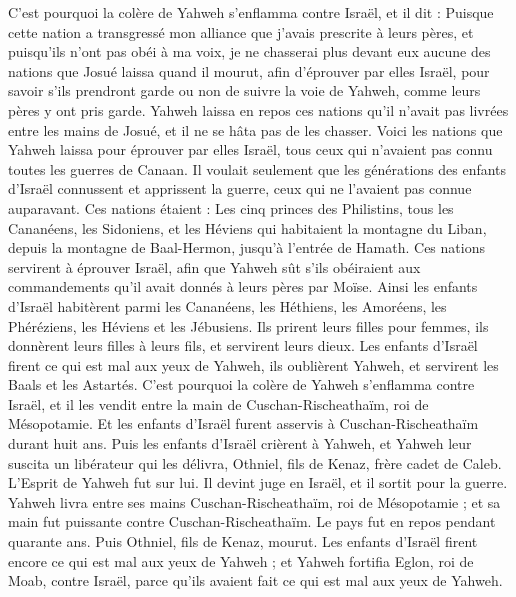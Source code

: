 \begin{multicols}{2}
C'est pourquoi la colère de Yahweh s'enflamma contre Israël, et il dit : Puisque cette nation a transgressé mon alliance que j'avais prescrite à leurs pères, et puisqu’ils n'ont pas obéi à ma voix,
je ne chasserai plus devant eux aucune des nations que Josué laissa quand il mourut,
afin d'éprouver par elles Israël, pour savoir s'ils prendront garde ou non de suivre la voie de Yahweh, comme leurs pères y ont pris garde.
Yahweh laissa en repos ces nations qu'il n'avait pas livrées entre les mains de Josué, et il ne se hâta pas de les chasser.
\VerseOne{}Voici les nations que Yahweh laissa pour éprouver par elles Israël, tous ceux qui n'avaient pas connu toutes les guerres de Canaan.
Il voulait seulement que les générations des enfants d'Israël connussent et apprissent la guerre, ceux qui ne l’avaient pas connue auparavant.
Ces nations étaient : Les cinq princes des Philistins, tous les Cananéens, les Sidoniens, et les Héviens qui habitaient la montagne du Liban, depuis la montagne de Baal-Hermon, jusqu'à l'entrée de Hamath.
Ces nations servirent à éprouver Israël, afin que  Yahweh sût s'ils obéiraient aux commandements qu’il avait donnés à leurs pères par Moïse.
Ainsi les enfants d'Israël habitèrent parmi les Cananéens, les Héthiens, les Amoréens, les Phéréziens, les Héviens et les Jébusiens.
Ils prirent leurs filles pour femmes, ils donnèrent leurs filles à leurs fils, et servirent leurs dieux.
Les enfants d'Israël firent ce qui est mal aux yeux de Yahweh, ils oublièrent Yahweh, et servirent les Baals et les Astartés.
C'est pourquoi la colère de Yahweh s'enflamma contre Israël, et il les vendit entre la main de Cuschan-Rischeathaïm, roi de Mésopotamie. Et les enfants d'Israël furent asservis à Cuschan-Rischeathaïm durant huit ans.
Puis les enfants d'Israël crièrent à Yahweh, et Yahweh leur suscita un libérateur qui les délivra, Othniel, fils de Kenaz, frère cadet de Caleb.
L’Esprit de Yahweh fut sur lui. Il devint juge en Israël, et il sortit pour la guerre. Yahweh livra entre ses mains Cuschan-Rischeathaïm, roi de Mésopotamie ; et sa main fut puissante contre Cuschan-Rischeathaïm.
Le pays fut en repos pendant quarante ans. Puis Othniel, fils de Kenaz, mourut.
Les enfants d'Israël firent encore ce qui est mal aux yeux de Yahweh ; et Yahweh fortifia Eglon, roi de Moab, contre Israël, parce qu'ils avaient fait ce qui est mal aux yeux de Yahweh.

\end{multicols}
